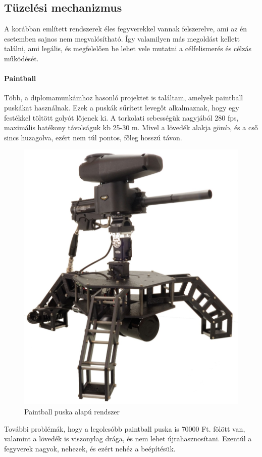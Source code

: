 \documentclass[12pt,a4paper]{article}
\begin{document}
\pagebreak

\subsection{Tüzelési mechanizmus}

A korábban említett rendszerek éles fegyverekkel vannak felszerelve, ami az én esetemben sajnos nem megvalósítható. Így valamilyen más megoldást kellett találni, ami legális, és megfelelően be lehet vele mutatni a célfelismerés és célzás működését. 


\paragraph{Paintball \cite{paintball}}

Több, a diplomamunkámhoz hasonló projektet is találtam, amelyek paintball puskákat használnak. Ezek a puskák sűrített levegőt alkalmaznak, hogy egy festékkel töltött golyót lőjenek ki. A torkolati sebességük nagyjából 280 fps, maximális hatékony távolságuk kb 25-30 m. Mivel a lövedék alakja gömb, és a cső sincs huzagolva, ezért nem túl pontos, főleg hosszú távon.\\

\begin{figure}[h!]
	\centering
	\includegraphics[width=0.6\linewidth]{irod_paintball}
	\caption{Paintball puska alapú rendszer \cite{paintballrobot}}
	\label{fig:irod_paintball}
\end{figure}

További problémák, hogy a legolcsóbb paintball puska is 70000 Ft. fölött van, valamint a lövedék is viszonylag drága, és nem lehet újrahasznosítani. Ezentúl a fegyverek nagyok, nehezek, és ezért nehéz a beépítésük. 
\end{document}
